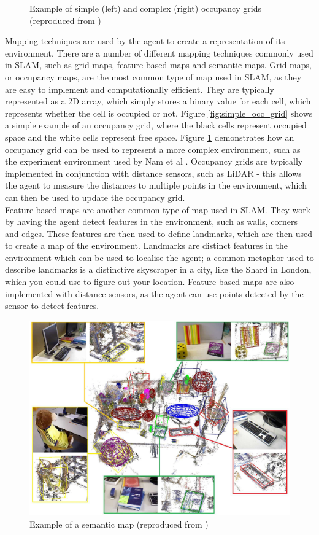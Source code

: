 \documentclass[12pt]{article}
\begin{document}
\begin{figure}[h]
\begin{minipage}{0.4\textwidth}
        \label{fig:complex_occ_grid}
    \end{minipage}
    \caption[Short caption]{Example of simple (left) and complex (right) occupancy grids (reproduced from \cite{occupancy_grid})}
\end{figure}

Mapping techniques are used by the agent to create a representation of its environment. There are a number of different mapping techniques
commonly used in SLAM, such as grid maps, feature-based maps and semantic maps. Grid maps, or occupancy maps, are the most common
type of map used in SLAM, as they are easy to implement and computationally efficient. They are typically represented as a 2D array, which
simply stores a binary value for each cell, which represents whether the cell is occupied or not. Figure \ref{fig:simple_occ_grid} shows a simple
example of an occupancy grid, where the black cells represent occupied space and the white cells represent free space. Figure \ref{fig:complex_occ_grid}
demonstrates how an occupancy grid can be used to represent a more complex environment, such as the experiment environment used by Nam
et al \cite{occupancy_grid}. Occupancy grids are typically implemented in conjunction with distance sensors, such as LiDAR - this allows the
agent to measure the distances to multiple points in the environment, which can then be used to update the occupancy grid. \\
Feature-based maps are another common type of map used in SLAM. They work by having the agent detect features in the environment, such as
walls, corners and edges. These features are then used to define landmarks, which are then used to create a map of the environment. Landmarks
are distinct features in the environment which can be used to localise the agent; a common metaphor used to describe landmarks is a distinctive
skyscraper in a city, like the Shard in London, which you could use to figure out your location. Feature-based maps are also implemented with
distance sensors, as the agent can use points detected by the sensor to detect features. \\
\begin{figure}
    \centering
    \includegraphics[width=0.7\linewidth]{semantic_maps}
    \caption[Short caption]{Example of a semantic map (reproduced from \cite{semantic_map})}
    \label{fig:semantic_map}
\end{figure}
\end{document}
